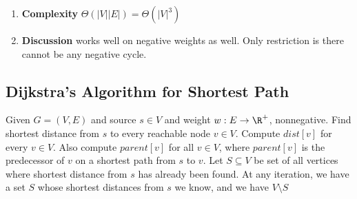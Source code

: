 \documentclass[11pt]{article}
\begin{document}
\begin{enumerate}
  \item \textbf{Complexity} $\Theta(|V||E|) = \Theta(|V|^3)$
  \item \textbf{Discussion} works well on negative weights as well. Only restriction is there cannot be any negative cycle.
\end{enumerate}




\subsection*{Dijkstra's Algorithm for Shortest Path}
Given $G = (V, E)$ and source $s\in V$ and weight $w: E \to \R^+$, nonnegative. Find shortest distance from $s$ to every reachable node $v\in V$. Compute $dist[v]$ for every $v\in V$. Also compute $parent[v]$ for all $v\in V$, where $parent[v]$ is the predecessor of $v$ on a shortest path from $s$ to $v$.
Let $S\subseteq V$ be set of all vertices where shortest distance from $s$ has already been found. At any iteration, we have a set $S$ whose shortest distances from $s$ we know, and we have $V\setminus S$


\begin{algorithm}[H]



\end{algorithm}
\end{document}
